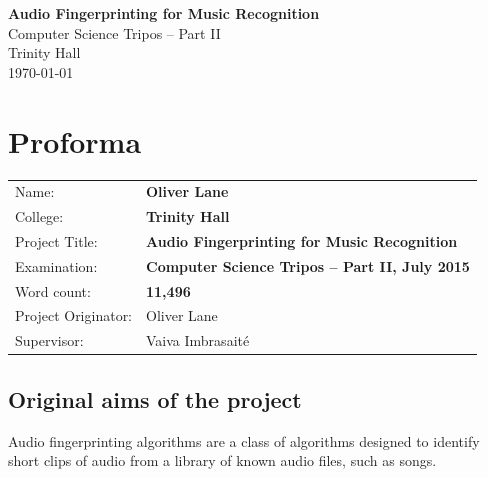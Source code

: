 \documentclass[12pt,a4paper,twoside,openright]{report}
\begin{document}





\begin{titlepage}


\vspace*{60mm}
\begin{center}
\Huge
\textbf{Audio Fingerprinting for Music Recognition} \\[5mm]
Computer Science Tripos -- Part II \\[5mm]
Trinity Hall \\[5mm]
\today  %
\end{center}


\end{titlepage}



\pagestyle{plain}
\cleardoublepage
{}

\chapter*{Proforma}

{\large
\begin{tabular}{ll}
Name:               & \bf Oliver Lane                       \\
College:            & \bf Trinity Hall                     \\
Project Title:      & \bf Audio Fingerprinting for Music Recognition \\
Examination:        & \bf Computer Science Tripos -- Part II, July 2015  \\
Word count:         & \bf 11,496  \\
Project Originator: & Oliver Lane                    \\
Supervisor:         & Vaiva Imbrasait\'{e}                    \\ 
\end{tabular}
}

\section*{Original aims of the project}

Audio fingerprinting algorithms are a class of algorithms designed to identify short clips of audio from a library of known audio files, such as songs.
\end{document}
